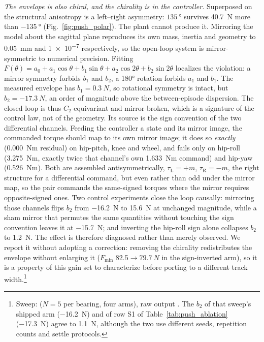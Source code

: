 \documentclass[a4paper,fleqn]{cas-dc}
\begin{document}
\emph{The envelope is also chiral, and the chirality is in the controller.}
Superposed on the structural anisotropy is a left--right asymmetry:
$\SI{135}{\degree}$ survives \SI{40.7}{N} more than $-\SI{135}{\degree}$
(Fig.~\ref{fig:push_polar}). The plant cannot produce it. Mirroring the model
about the sagittal plane reproduces its own mass, inertia and geometry to
\SI{0.05}{mm} and \num{1e-7} respectively, so the open-loop system is
mirror-symmetric to numerical precision. Fitting
$F(\theta){=}a_0{+}a_1\cos\theta{+}b_1\sin\theta{+}a_2\cos2\theta{+}b_2\sin2\theta$
localizes the violation: a mirror symmetry forbids $b_1$ and $b_2$, a
\ang{180} rotation forbids $a_1$ and $b_1$. The measured envelope has
$b_1{=}\SI{0.3}{N}$, so rotational symmetry is intact, but $b_2{=}\SI{-17.3}{N}$, an order of magnitude above the between-episode
dispersion. The closed loop is thus $C_2$-equivariant and mirror-broken, which
is a signature of the control law, not of the geometry.
Its source is the sign convention of the two differential channels. Feeding the
controller a state and its mirror image, the commanded torque should map to its
own mirror image; it does so \emph{exactly} (\SI{0.000}{Nm} residual) on
hip-pitch, knee and wheel, and fails only on hip-roll (\SI{3.275}{Nm}, exactly
twice that channel's own \SI{1.633}{Nm} command) and hip-yaw (\SI{0.526}{Nm}).
Both are assembled antisymmetrically, $\tau_{\text{L}}{=}{+}m$,
$\tau_{\text{R}}{=}{-}m$, the right structure for a differential command, but
even rather than odd under the mirror map, so the pair commands the
same-signed torques where the mirror requires opposite-signed ones. Two
control experiments close the loop causally: mirroring those channels flips
$b_2$ from \SI{-16.2}{N} to \SI{+15.6}{N} at unchanged magnitude, while a sham
mirror that permutes the same quantities without touching the sign convention
leaves it at \SI{-15.7}{N}; and inverting the hip-roll sign alone collapses
$b_2$ to \SI{+1.2}{N}. The effect is therefore diagnosed rather than
merely observed. We report it without adopting a correction: removing the
chirality redistributes the envelope without enlarging it
($F_{\min}$ \SI{82.5}{}${\rightarrow}\SI{79.7}{N}$ in the sign-inverted arm),
so it is a property of this gain set to characterize before porting to a
different track width.\footnote{Sweep:
 ($N{=}5$ per bearing, four arms), raw
output . The $b_2$ of that sweep's shipped arm
(\SI{-16.2}{N}) and of row S1 of Table~\ref{tab:push_ablation}
(\SI{-17.3}{N}) agree to \SI{1.1}{N}, although the two use different seeds,
repetition counts and settle protocols.}
\end{document}
